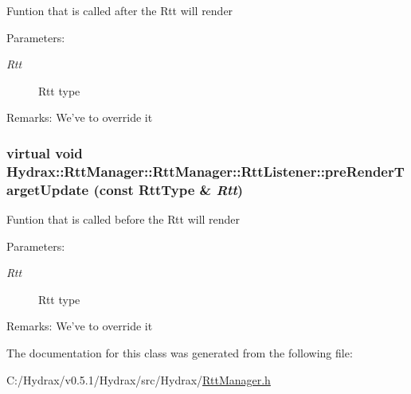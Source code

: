 Funtion that is called after the Rtt will render \begin{Desc}
\item[Parameters:]
\begin{description}
\item[{\em Rtt}]Rtt type \end{description}
\end{Desc}
\begin{Desc}
\item[Remarks:]We've to override it \end{Desc}
\hypertarget{class_hydrax_1_1_rtt_manager_1_1_rtt_listener_64191ee4842c729d3936409280bb05cf}{
\subsubsection[{preRenderTargetUpdate}]{\setlength{\rightskip}{0pt plus 5cm}virtual void Hydrax::RttManager::RttManager::RttListener::preRenderTargetUpdate (const {\bf RttType} \& {\em Rtt})}}
\label{class_hydrax_1_1_rtt_manager_1_1_rtt_listener_64191ee4842c729d3936409280bb05cf}


Funtion that is called before the Rtt will render \begin{Desc}
\item[Parameters:]
\begin{description}
\item[{\em Rtt}]Rtt type \end{description}
\end{Desc}
\begin{Desc}
\item[Remarks:]We've to override it \end{Desc}


The documentation for this class was generated from the following file:\begin{CompactItemize}
\item 
C:/Hydrax/v0.5.1/Hydrax/src/Hydrax/\hyperlink{_rtt_manager_8h}{RttManager.h}\end{CompactItemize}
